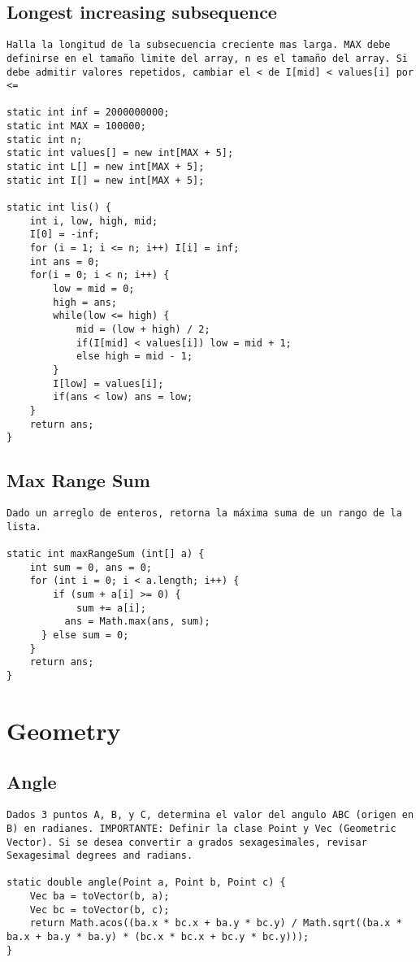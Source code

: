\documentclass[10pt,letterpaper,twocolumn,twosided]{article}
\begin{document}
\subsection{Longest increasing subsequence}
\begin{lstlisting}
Halla la longitud de la subsecuencia creciente mas larga. MAX debe definirse en el tamaño limite del array, n es el tamaño del array. Si debe admitir valores repetidos, cambiar el < de I[mid] < values[i] por <=

static int inf = 2000000000;
static int MAX = 100000; 
static int n;
static int values[] = new int[MAX + 5];
static int L[] = new int[MAX + 5]; 
static int I[] = new int[MAX + 5]; 

static int lis() { 
 	int i, low, high, mid;
 	I[0] = -inf; 
 	for (i = 1; i <= n; i++) I[i] = inf;
  	int ans = 0;
 	for(i = 0; i < n; i++) {
		low = mid = 0;
 		high = ans;
 		while(low <= high) {
 			mid = (low + high) / 2;
 			if(I[mid] < values[i]) low = mid + 1;
 			else high = mid - 1;
 		} 
 		I[low] = values[i];
 		if(ans < low) ans = low;
	}
 	return ans;
}
\end{lstlisting}

\subsection{Max Range Sum}
\begin{lstlisting}
Dado un arreglo de enteros, retorna la máxima suma de un rango de la lista.

static int maxRangeSum (int[] a) {
	int sum = 0, ans = 0;
	for (int i = 0; i < a.length; i++) {
		if (sum + a[i] >= 0) {  
			sum += a[i];
		  ans = Math.max(ans, sum);          
	  } else sum = 0;
	}
	return ans;
}
\end{lstlisting}

\section{Geometry}

\subsection{Angle}
\begin{lstlisting}
Dados 3 puntos A, B, y C, determina el valor del angulo ABC (origen en B) en radianes. IMPORTANTE: Definir la clase Point y Vec (Geometric Vector). Si se desea convertir a grados sexagesimales, revisar Sexagesimal degrees and radians.

static double angle(Point a, Point b, Point c) { 
  	Vec ba = toVector(b, a);
  	Vec bc = toVector(b, c);
  	return Math.acos((ba.x * bc.x + ba.y * bc.y) / Math.sqrt((ba.x * ba.x + ba.y * ba.y) * (bc.x * bc.x + bc.y * bc.y))); 
}
\end{lstlisting}
\end{document}
